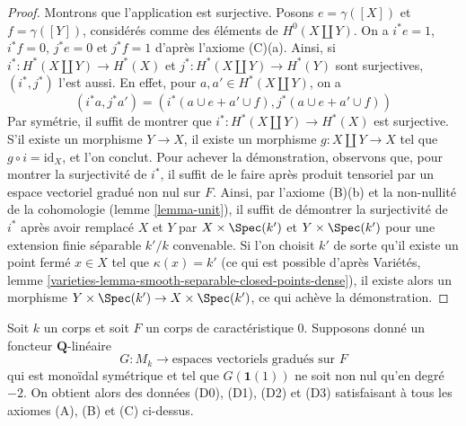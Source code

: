 \begin{proof}
\medskip\noindent
Montrons que l'application est surjective. Posons $e = \gamma([X])$ et $f = \gamma([Y])$,
considérés comme des éléments de $H^0(X \amalg Y)$. On a
$i^*e = 1$, $i^*f = 0$, $j^*e = 0$ et $j^*f = 1$ d'après l'axiome (C)(a).
Ainsi, si $i^* : H^*(X \amalg Y) \to  H^*(X)$
et $j^* : H^*(X \amalg Y) \to H^*(Y)$ sont surjectives,
$(i^*, j^*)$ l'est aussi. En effet, pour $a, a' \in H^*(X \amalg Y)$,
on a
$$
(i^*a, j^*a') = (i^*(a \cup e + a' \cup f), j^*(a \cup e + a' \cup f))
$$
Par symétrie, il suffit de montrer que $i^* : H^*(X \amalg Y) \to  H^*(X)$
est surjective. S'il existe un morphisme $Y \to X$, il existe un morphisme
$g : X \amalg Y \to X$ tel que $g \circ i = \text{id}_X$, et l'on conclut.
Pour achever la démonstration, observons que, pour montrer
la surjectivité de $i^*$, il suffit de le faire après produit tensoriel
par un espace vectoriel gradué non nul sur $F$. Ainsi, par l'axiome (B)(b)
et la non-nullité de la cohomologie (lemme \ref{lemma-unit}),
il suffit de démontrer la surjectivité de $i^*$ après avoir remplacé
$X$ et $Y$ par $X \times \Spec(k')$ et $Y \times \Spec(k')$
pour une extension finie séparable $k'/k$ convenable.
Si l'on choisit $k'$ de sorte qu'il existe un point fermé
$x \in X$ tel que $\kappa(x) = k'$ (ce qui est possible d'après
Variétés, lemme \ref{varieties-lemma-smooth-separable-closed-points-dense}),
il existe alors un morphisme $Y \times \Spec(k') \to X \times \Spec(k')$,
ce qui achève la démonstration.
\end{proof}

\begin{lemma}
\label{lemma-from-functor-to-weil}
Soit $k$ un corps et soit $F$ un corps de caractéristique $0$.
Supposons donné un foncteur $\mathbf{Q}$-linéaire
$$
G : M_k \longrightarrow \text{espaces vectoriels gradués sur }F\text{}
$$
qui est monoïdal symétrique et tel que $G(\mathbf{1}(1))$
ne soit non nul qu'en degré $-2$. On obtient alors des données (D0), (D1), (D2) et (D3)
satisfaisant à tous les axiomes (A), (B) et (C) ci-dessus.
\end{lemma}


